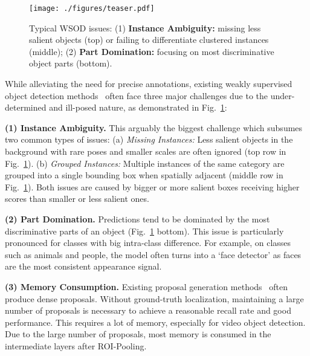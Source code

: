 \documentclass[10pt,twocolumn,letterpaper]{article}
\begin{document}
\begin{figure}[t]
\centering
\texttt{[image: ./figures/teaser.pdf]}
\caption{Typical WSOD issues: (1) \textbf{Instance Ambiguity:} missing less salient objects (top) or failing to differentiate clustered instances (middle); (2) \textbf{Part Domination:} focusing on most discriminative object parts (bottom). }
\label{fig:teaser}
\vspace{-1.5em}
\end{figure}

While alleviating the need for precise annotations, existing weakly supervised object detection methods~\cite{Bilen16, tang2017multiple, c-mil, singh-cvpr2019, Zeng_2019_ICCV} often face three major challenges due to the under-determined and ill-posed nature, as demonstrated in Fig.~\ref{fig:teaser}: 

\noindent\textbf{{(1) Instance Ambiguity.}} This arguably the biggest challenge which subsumes two common types of issues: 
(a) \textit{Missing  Instances:} Less salient objects in the background with rare poses and smaller scales are often ignored (top row in Fig.~\ref{fig:teaser}). 
(b) \textit{Grouped Instances:} Multiple instances of the same category are grouped into a single bounding box when spatially adjacent (middle row in Fig.~\ref{fig:teaser}).
Both issues are caused by bigger or more salient boxes receiving higher scores than smaller or less salient ones. 

\noindent\textbf{{(2) Part Domination.}}  Predictions tend to be dominated by the most discriminative parts of an object (Fig.~\ref{fig:teaser} bottom). This issue is particularly pronounced for classes with big intra-class difference. For example, on classes such as animals and people, the model often turns into a `face detector' as faces are the most consistent appearance signal.

\noindent\textbf{{(3) Memory Consumption.}} Existing proposal generation methods~\cite{ss, eb} often produce dense proposals. Without ground-truth localization, maintaining a large number of proposals is necessary to achieve a reasonable recall rate and good performance. This requires a lot of memory, especially for video object detection. Due to the large number of proposals, most memory is consumed in the intermediate layers after ROI-Pooling. 
\end{document}
